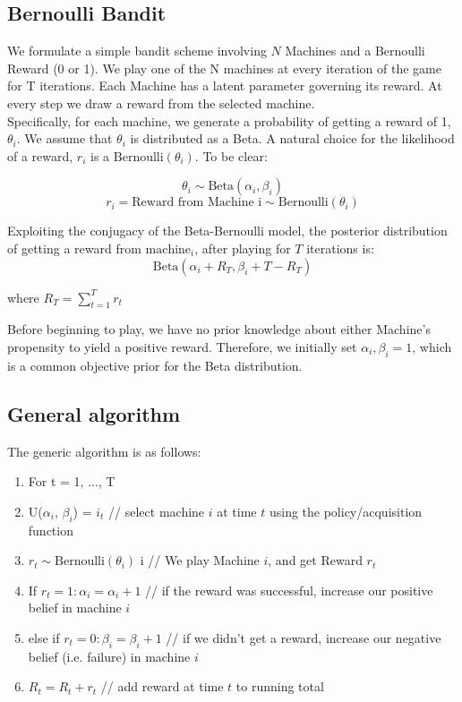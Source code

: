 \documentclass{article}
\begin{document}
\subsection{Bernoulli Bandit}

We formulate a simple bandit scheme involving $N$ Machines and a Bernoulli Reward (0 or 1). We play one of the N machines at every iteration of the game for T iterations. Each Machine has a latent parameter governing its reward. At every step we draw a reward from the selected machine.\\

Specifically, for each machine, we generate a probability of getting a reward of 1, $\theta_i$. We assume that $\theta_i$ is distributed as a Beta. A natural choice for the likelihood of a reward, $r_i$ is a $\text{Bernoulli}(\theta_i)$. To be clear:

$$\theta_i \sim \text{Beta}(\alpha_i, \beta_i)$$
$$r_i = \text{Reward from Machine i} \sim \text{Bernoulli}(\theta_i)$$

Exploiting the conjugacy of the Beta-Bernoulli model, the posterior distribution of getting a reward from $\text{machine}_i$, after playing for $T$ iterations is:
$$\text{Beta}(\alpha_i + R_{T}, \beta_i + T - R_{T})$$

where $R_{T} = \sum_{t=1}^{T}r_{t}$

Before beginning to play, we have no prior knowledge about either Machine's propensity to yield a positive reward. Therefore, we initially set $\alpha_i, \beta_i = 1$, which is a common objective prior for the Beta distribution.\\

\subsection{General algorithm}

The generic algorithm is as follows:

\begin{enumerate}
\item For t = 1, ..., T
\item U($\alpha_i$, $\beta_i$) = $i_t$  // select machine $i$ at time $t$ using the policy/acquisition function
\item $r_t \sim \text{Bernoulli}(\theta_{i})$  i  // We play Machine $i$, and get Reward $r_t$
\item If $r_t = 1: \alpha_i = \alpha_i + 1$   // if the reward was successful, increase our positive belief in machine $i$
\item else if $r_t = 0: \beta_i = \beta_i + 1$  // if we didn't get a reward, increase our negative belief (i.e. failure) in machine $i$
\item $R_t = R_t + r_t$		// add reward at time $t$ to running total
\end{enumerate}
\end{document}
